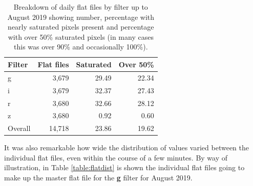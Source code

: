 \begin{table}[!htbp]
\begin{center}
\begin{tabular}{lrrr} \hline
Filter & Flat files & Saturated & Over 50\%\\\hline
g & 3,679 & 29.49 & 22.34 \\
i & 3,679 & 32.37 & 27.43 \\
r & 3,680 & 32.66 & 28.12 \\
z & 3,680 & 0.92 & 0.60 \\\hline
Overall & 14,718 & 23.86 & 19.62\\
\hline
\end{tabular}
\end{center}
\caption{Breakdown of daily flat files by filter up to August 2019 showing
number, percentage with nearly saturated pixels present and percentage with over
50\% saturated pixels (in many cases this was over 90\% and occasionally 100\%).}
\protect\label{table:satpix}
\end{table}

It was also remarkable how wide the distribution of values varied between the
individual flat files, even within the course of a few minutes. By way of
illustration, in Table \ref{table:flatdist} is shown the individual flat files
going to make up the master flat file for the \textbf{g} filter for August 2019.

